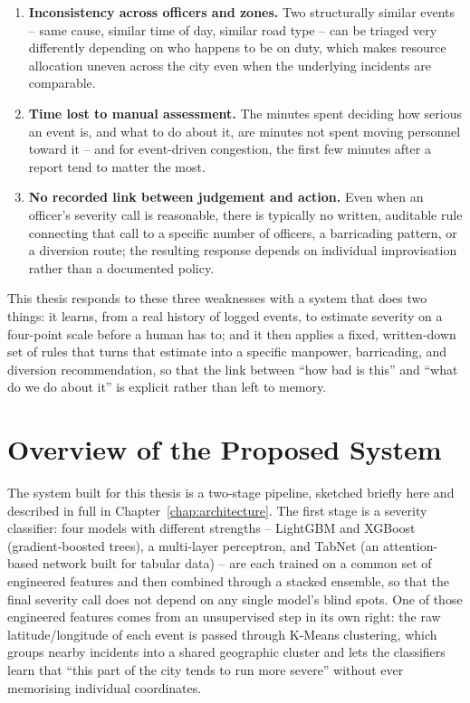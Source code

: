 \begin{enumerate}
\item \textbf{Inconsistency across officers and zones.} Two structurally similar events -- same cause, similar time of day, similar road type -- can be triaged very differently depending on who happens to be on duty, which makes resource allocation uneven across the city even when the underlying incidents are comparable.
\item \textbf{Time lost to manual assessment.} The minutes spent deciding how serious an event is, and what to do about it, are minutes not spent moving personnel toward it -- and for event-driven congestion, the first few minutes after a report tend to matter the most.
\item \textbf{No recorded link between judgement and action.} Even when an officer's severity call is reasonable, there is typically no written, auditable rule connecting that call to a specific number of officers, a barricading pattern, or a diversion route; the resulting response depends on individual improvisation rather than a documented policy.
\end{enumerate}

This thesis responds to these three weaknesses with a system that does two things: it learns, from a real history of logged events, to estimate severity on a four-point scale before a human has to; and it then applies a fixed, written-down set of rules that turns that estimate into a specific manpower, barricading, and diversion recommendation, so that the link between ``how bad is this'' and ``what do we do about it'' is explicit rather than left to memory.

\section{Overview of the Proposed System}

The system built for this thesis is a two-stage pipeline, sketched briefly here and described in full in Chapter~\ref{chap:architecture}. The first stage is a severity classifier: four models with different strengths -- LightGBM and XGBoost (gradient-boosted trees), a multi-layer perceptron, and TabNet (an attention-based network built for tabular data) -- are each trained on a common set of engineered features and then combined through a stacked ensemble, so that the final severity call does not depend on any single model's blind spots. One of those engineered features comes from an unsupervised step in its own right: the raw latitude/longitude of each event is passed through K-Means clustering, which groups nearby incidents into a shared geographic cluster and lets the classifiers learn that ``this part of the city tends to run more severe'' without ever memorising individual coordinates.

